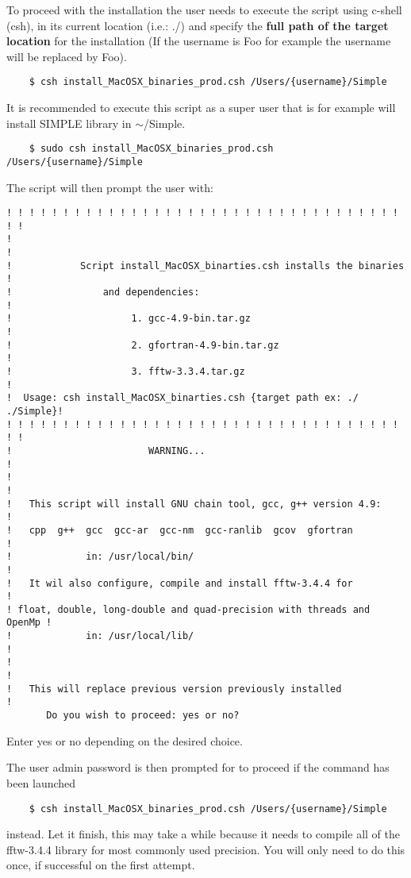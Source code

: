 \documentclass[review]{elsarticle}
\begin{document}
To proceed with the installation the user needs to execute the script
using c-shell (csh), in its current location (i.e.: ./) and specify the
{\bf{full path of the target location}} for the installation (If the
username is Foo for example the username will be replaced by Foo).
\begin{verbatim}
    $ csh install_MacOSX_binaries_prod.csh /Users/{username}/Simple
\end{verbatim}
It is recommended to execute this script as a super user that is for
example will install SIMPLE library in $\sim$/Simple.
\begin{verbatim}
    $ sudo csh install_MacOSX_binaries_prod.csh /Users/{username}/Simple
\end{verbatim}
The script will then prompt the user with:
\begin{verbatim}
! ! ! ! ! ! ! ! ! ! ! ! ! ! ! ! ! ! ! ! ! ! ! ! ! ! ! ! ! ! ! ! ! ! ! ! !
!                                                                       !
!            Script install_MacOSX_binarties.csh installs the binaries  !
!                and dependencies:                                      !
!                     1. gcc-4.9-bin.tar.gz                             !
!                     2. gfortran-4.9-bin.tar.gz                        !
!                     3. fftw-3.3.4.tar.gz                              !
!  Usage: csh install_MacOSX_binarties.csh {target path ex: ./ ./Simple}!
! ! ! ! ! ! ! ! ! ! ! ! ! ! ! ! ! ! ! ! ! ! ! ! ! ! ! ! ! ! ! ! ! ! ! ! !
!                        WARNING...                                     !
!                                                                       !
!   This script will install GNU chain tool, gcc, g++ version 4.9:      !
!   cpp  g++  gcc  gcc-ar  gcc-nm  gcc-ranlib  gcov  gfortran           !
!             in: /usr/local/bin/                                       !
!   It wil also configure, compile and install fftw-3.4.4 for           !
! float, double, long-double and quad-precision with threads and OpenMp !
!             in: /usr/local/lib/                                       !
!                                                                       !
!   This will replace previous version previously installed             !
       Do you wish to proceed: yes or no?
\end{verbatim}

Enter yes or no depending on the desired choice.

The user admin password is then prompted for to proceed if the command
has been launched
\begin{verbatim}
    $ csh install_MacOSX_binaries_prod.csh /Users/{username}/Simple
\end{verbatim}
instead. Let it finish, this may take a while because it needs to
compile all of the fftw-3.4.4 library for most commonly used
precision. You will only need to do this once, if successful on the
first attempt.
\end{document}
